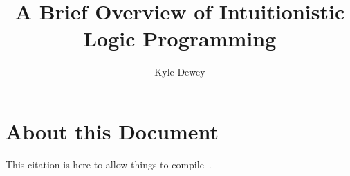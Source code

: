 \documentclass{scrartcl}
\begin{document}
\title{A Brief Overview of Intuitionistic Logic Programming}
\author{Kyle Dewey}

\maketitle

\section{About this Document}

This citation is here to allow things to compile~\cite{McCartyS94}.



\end{document}
